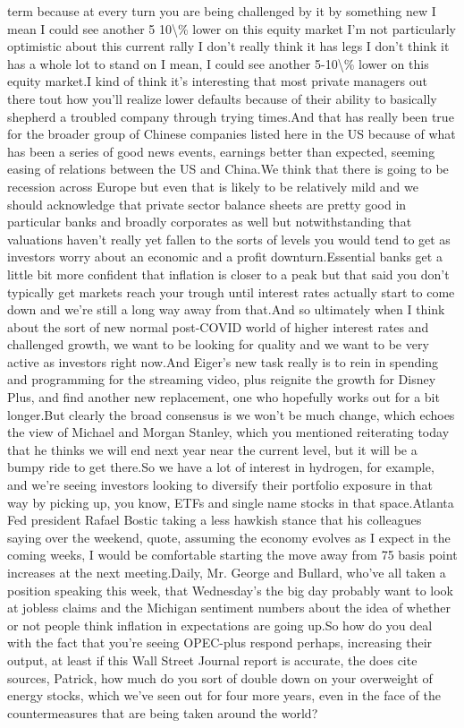 \documentclass{article}%
\begin{document}
term because at every turn you are being challenged by it by something new I mean I could see another 5 10\textbackslash{}\% lower on this equity market I'm not particularly optimistic about this current rally I don't really think it has legs I don't think it has a whole lot to stand on  I mean, I could see another 5{-}10\textbackslash{}\% lower on this equity market.I kind of think it's interesting that most private managers out there tout how you'll realize lower defaults because of their ability to basically shepherd a troubled company through trying times.And that has really been true for the broader group of Chinese companies listed here in the US because of what has been a series of good news events, earnings better than expected, seeming easing of relations between the US and China.We think that there is going to be recession across Europe but even that is likely to be relatively mild and we should acknowledge that private sector balance sheets are pretty good in particular banks and broadly corporates as well but notwithstanding that valuations haven't really yet fallen to the sorts of levels you would tend to get as investors worry about an economic and a profit downturn.Essential banks get a little bit more confident that inflation is closer to a peak but that said you don't typically get markets reach your trough until interest rates actually start to come down and we're still a long way away from that.And so ultimately when I think about the sort of new normal post{-}COVID world of higher interest rates and challenged growth, we want to be looking for quality and we want to be very active as investors right now.And Eiger's new task really is to rein in spending and programming for the streaming video, plus reignite the growth for Disney Plus, and find another new replacement, one who hopefully works out for a bit longer.But clearly the broad consensus is we won't be much change, which echoes the view of Michael and Morgan Stanley, which you mentioned reiterating today that he thinks we will end next year near the current level, but it will be a bumpy ride to get there.So we have a lot of interest in hydrogen, for example, and we're seeing investors looking to diversify their portfolio exposure in that way by picking up, you know, ETFs and single name stocks in that space.Atlanta Fed president Rafael Bostic taking a less hawkish stance that his colleagues saying over the weekend, quote, assuming the economy evolves as I expect in the coming weeks, I would be comfortable starting the move away from 75 basis point increases at the next meeting.Daily, Mr. George and Bullard, who've all taken a position speaking this week, that Wednesday's the big day probably want to look at jobless claims and the Michigan sentiment numbers about the idea of whether or not people think inflation in expectations are going up.So how do you deal with the fact that you're seeing OPEC{-}plus respond perhaps, increasing their output, at least if this Wall Street Journal report is accurate, the does cite sources, Patrick, how much do you sort of double down on your overweight of energy stocks, which we've seen out for four more years, even in the face of the countermeasures that are being taken around the world?%
\end{document}
